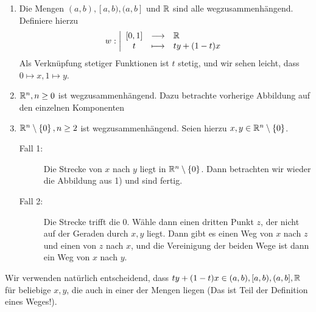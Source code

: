 \begin{example}
    \begin{enumerate}[1)]
        \item  Die Mengen $(a,b), [a,b), (a,b]$ und $\mathbb{R}$ sind alle wegzusammenhängend. Definiere hierzu
        \begin{equation*}
        w: \left| \begin{array}{c c l} 
            [0,1] & \longrightarrow & \mathbb{R} \\
            t & \longmapsto &  ty + (1-t)x
        \end{array} \right.
    \end{equation*}
   Als Verknüpfung stetiger Funktionen ist $t$ stetig, und wir sehen leicht, dass  $0 \mapsto x, 1 \mapsto y$. 
   \item $\mathbb{R}^n, n\geq 0$ ist wegzusammenhängend. Dazu betrachte vorherige Abbildung auf den einzelnen Komponenten
   \item $\mathbb{R}^n \setminus \left \{0\right\} , n\geq 2$ ist wegzusammenhängend. Seien hierzu $x,y\in \mathbb{R}^n \setminus \left \{0\right\}$.
       \begin{description}
           \item[Fall 1:] Die Strecke von $x$ nach  $y$ liegt in  $\mathbb{R}^n \setminus \left \{0\right\}$. Dann betrachten wir wieder die Abbildung aus 1) und sind fertig.
           \item[Fall 2:] Die Strecke trifft die $0$. Wähle dann einen dritten Punkt $z$, der nicht auf der Geraden durch $x,y$ liegt. Dann gibt es einen Weg von $x$ nach  $z$ und einen von  $z$ nach  $x$, und die Vereinigung der beiden Wege ist dann ein Weg von  $x$ nach  $y$.
       \end{description}
    \end{enumerate}
\end{example}

\begin{remark*}
    Wir verwenden natürlich entscheidend, dass $ty + (1-t)x \in (a,b),[a,b),(a,b],\mathbb{R}$ für beliebige $x,y$, die auch in einer der Mengen liegen (Das ist Teil der Definition eines Weges!).
\end{remark*}


